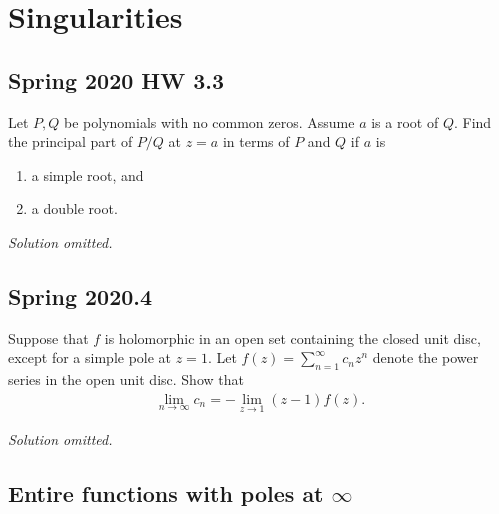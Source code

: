 \hypertarget{singularities}{%
\section{Singularities}\label{singularities}}

\hypertarget{spring-2020-hw-3.3}{%
\subsection{Spring 2020 HW 3.3}\label{spring-2020-hw-3.3}}

\begin{problem}[?]

Let \(P, Q\) be polynomials with no common zeros. Assume \(a\) is a root
of \(Q\). Find the principal part of \(P/Q\) at \(z=a\) in terms of
\(P\) and \(Q\) if \(a\) is

\begin{enumerate}
\def\labelenumi{(\arabic{enumi})}
\tightlist
\item
  a simple root, and
\item
  a double root.
\end{enumerate}

\end{problem}

\emph{Solution omitted.}

\hypertarget{spring-2020.4}{%
\subsection{Spring 2020.4}\label{spring-2020.4}}

\begin{problem}[?]

Suppose that \(f\) is holomorphic in an open set containing the closed
unit disc, except for a simple pole at \(z=1\). Let
\(f(z)=\sum_{n=1}^{\infty} c_{n} z^{n}\) denote the power series in the
open unit disc. Show that
\begin{align*}
\lim _{n \rightarrow \infty} c_{n}=-\lim _{z \rightarrow 1}(z-1) f(z)
.\end{align*}

\end{problem}

\emph{Solution omitted.}

\hypertarget{entire-functions-with-poles-at-infty}{%
\subsection{\texorpdfstring{Entire functions with poles at
\(\infty\)}{Entire functions with poles at \textbackslash infty}}\label{entire-functions-with-poles-at-infty}}

